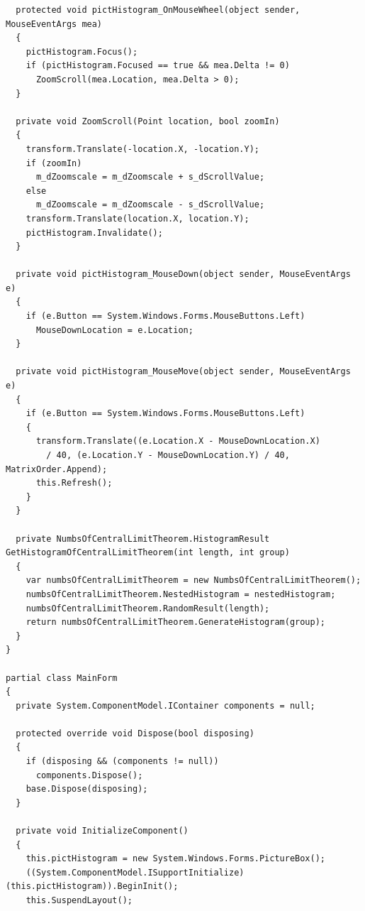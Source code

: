 \begin{apendicesenv}
\begin{lstlisting}
  protected void pictHistogram_OnMouseWheel(object sender, MouseEventArgs mea)
  {
    pictHistogram.Focus();
    if (pictHistogram.Focused == true && mea.Delta != 0)
      ZoomScroll(mea.Location, mea.Delta > 0);
  }

  private void ZoomScroll(Point location, bool zoomIn)
  {
    transform.Translate(-location.X, -location.Y);
    if (zoomIn)
      m_dZoomscale = m_dZoomscale + s_dScrollValue;
    else
      m_dZoomscale = m_dZoomscale - s_dScrollValue;
    transform.Translate(location.X, location.Y);
    pictHistogram.Invalidate();
  }

  private void pictHistogram_MouseDown(object sender, MouseEventArgs e)
  {
    if (e.Button == System.Windows.Forms.MouseButtons.Left)
      MouseDownLocation = e.Location;
  }

  private void pictHistogram_MouseMove(object sender, MouseEventArgs e)
  {
    if (e.Button == System.Windows.Forms.MouseButtons.Left)
    {
      transform.Translate((e.Location.X - MouseDownLocation.X)
        / 40, (e.Location.Y - MouseDownLocation.Y) / 40, MatrixOrder.Append);
      this.Refresh();
    }
  }

  private NumbsOfCentralLimitTheorem.HistogramResult GetHistogramOfCentralLimitTheorem(int length, int group)
  {
    var numbsOfCentralLimitTheorem = new NumbsOfCentralLimitTheorem();
    numbsOfCentralLimitTheorem.NestedHistogram = nestedHistogram;
    numbsOfCentralLimitTheorem.RandomResult(length);
    return numbsOfCentralLimitTheorem.GenerateHistogram(group);
  }
}

partial class MainForm
{
  private System.ComponentModel.IContainer components = null;

  protected override void Dispose(bool disposing)
  {
    if (disposing && (components != null))
      components.Dispose();
    base.Dispose(disposing);
  }

  private void InitializeComponent()
  {
    this.pictHistogram = new System.Windows.Forms.PictureBox();
    ((System.ComponentModel.ISupportInitialize)(this.pictHistogram)).BeginInit();
    this.SuspendLayout();


\end{lstlisting}
\end{apendicesenv}
